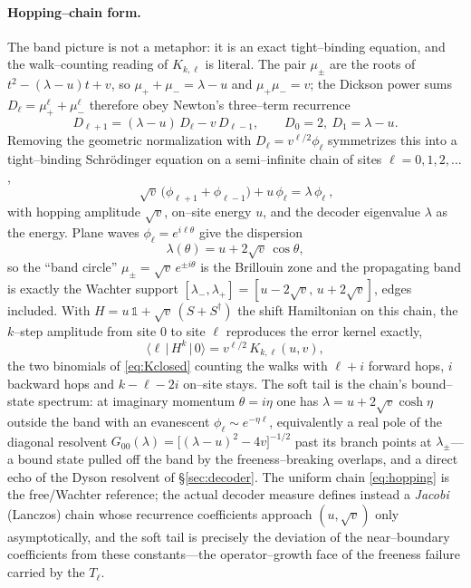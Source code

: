 \documentclass[11pt]{article}
\begin{document}
\paragraph{Hopping--chain form.} The band picture is not a metaphor: it is an exact tight--binding
equation, and the walk--counting reading of $K_{k,\ell}$ is literal. The pair $\mu_\pm$ are the roots of
$t^2-(\lambda-u)t+v$, so $\mu_++\mu_-=\lambda-u$ and $\mu_+\mu_-=v$; the Dickson power sums
$D_\ell=\mu_+^\ell+\mu_-^\ell$ therefore obey Newton's three--term recurrence
\begin{equation}
  D_{\ell+1}=(\lambda-u)\,D_\ell-v\,D_{\ell-1},\qquad D_0=2,\ D_1=\lambda-u .
  \label{eq:hoprec}
\end{equation}
Removing the geometric normalization with $D_\ell=v^{\ell/2}\phi_\ell$ symmetrizes this into a
tight--binding Schr\"odinger equation on a semi--infinite chain of sites $\ell=0,1,2,\dots$,
\begin{equation}
  \boxed{\ \sqrt v\,\big(\phi_{\ell+1}+\phi_{\ell-1}\big)+u\,\phi_\ell=\lambda\,\phi_\ell\ } ,
  \label{eq:hopping}
\end{equation}
with hopping amplitude $\sqrt v$, on--site energy $u$, and the decoder eigenvalue $\lambda$ as the
energy. Plane waves $\phi_\ell=e^{i\ell\theta}$ give the dispersion
\begin{equation}
  \lambda(\theta)=u+2\sqrt v\,\cos\theta ,
  \label{eq:disp}
\end{equation}
so the ``band circle'' $\mu_\pm=\sqrt v\,e^{\pm i\theta}$ is the Brillouin zone and the propagating band
is exactly the Wachter support $[\lambda_-,\lambda_+]=[u-2\sqrt v,\,u+2\sqrt v]$, edges included. With
$H=u\,\mathbb 1+\sqrt v\,(S+S^\dagger)$ the shift Hamiltonian on this chain, the $k$--step amplitude
from site $0$ to site $\ell$ reproduces the error kernel exactly,
\begin{equation}
  \big\langle \ell\,\big|\,H^k\,\big|\,0\big\rangle=v^{\ell/2}\,K_{k,\ell}(u,v),
  \label{eq:propagator}
\end{equation}
the two binomials of \eqref{eq:Kclosed} counting the walks with $\ell+i$ forward hops, $i$ backward
hops and $k-\ell-2i$ on--site stays. The soft tail is the chain's bound--state spectrum: at imaginary
momentum $\theta=i\eta$ one has $\lambda=u+2\sqrt v\cosh\eta$ outside the band with an evanescent
$\phi_\ell\sim e^{-\eta\ell}$, equivalently a real pole of the diagonal resolvent
$G_{00}(\lambda)=\big[(\lambda-u)^2-4v\big]^{-1/2}$ past its branch points at $\lambda_\pm$---a bound
state pulled off the band by the freeness--breaking overlaps, and a direct echo of the Dyson resolvent
of \S\ref{sec:decoder}. The uniform chain \eqref{eq:hopping} is the free/Wachter reference; the actual
decoder measure defines instead a \emph{Jacobi} (Lanczos) chain whose recurrence coefficients approach
$(u,\sqrt v)$ only asymptotically, and the soft tail is precisely the deviation of the near--boundary
coefficients from these constants---the operator--growth face of the freeness failure carried by the
$T_\ell$.
\end{document}
